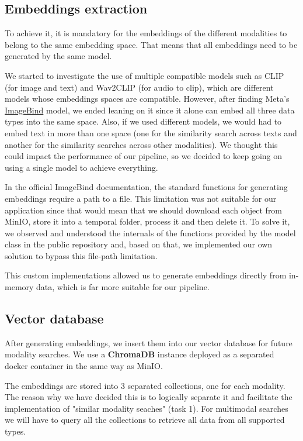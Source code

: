 \documentclass[12pt]{article}
\begin{document}
\subsection{Embeddings extraction}
To achieve it, it is mandatory for the embeddings of the different modalities to belong to the same embedding space. That means that all embeddings need to be generated by the same model.

We started to investigate the use of multiple compatible models such as CLIP (for image and text) and Wav2CLIP (for audio to clip), which are different models whose embeddings spaces are compatible. However, after finding Meta's \href{https://github.com/facebookresearch/ImageBind}{ImageBind} model, we ended leaning on it since it alone can embed all three data types into the same space. Also, if we used different models, we would had to embed text in more than one space (one for the similarity search across texts and another for the similarity searches across other modalities). We thought this could impact the performance of our pipeline, so we decided to keep going on using a single model to achieve everything.

In the official ImageBind documentation, the standard functions for generating embeddings require a path to a file. This limitation was not suitable for our application since that would mean that we should download each object from MinIO, store it into a temporal folder, process it and then delete it. To solve it, we observed and understood the internals of the functions provided by the model class in the public repository and, based on that, we implemented our own solution to bypass this file-path limitation.

This custom implementations allowed us to generate embeddings directly from in-memory data, which is far more suitable for our pipeline. 

\subsection{Vector database}
After generating embeddings, we insert them into our vector database for future modality searches. We use a \textbf{ChromaDB} instance deployed as a separated docker container in the same way as MinIO. 

The embeddings are stored into 3 separated collections, one for each modality. The reason why we have decided this is to logically separate it and facilitate the implementation of "similar modality seaches" (task 1). For multimodal searches we will have to query all the collections to retrieve all data from all supported types.
\end{document}
